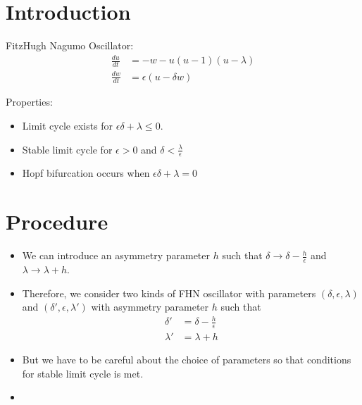 \documentclass[paper=a4, fontsize=12pt]{scrartcl} %
\begin{document}
\section{Introduction}
FitzHugh Nagumo Oscillator:
\begin{align}
\frac{du}{dt} &= - w - u(u-1)(u-\lambda) \nonumber \\
\frac{dw}{dt} &= \epsilon(u-\delta w)
\end{align}

Properties:
\begin{itemize}
    \item Limit cycle exists for $\epsilon\delta + \lambda\leq0$.
    \item Stable limit cycle for $\epsilon > 0$ and $\delta < 
    \frac{\lambda}{\epsilon}$
    \item Hopf bifurcation occurs when $\epsilon\delta + \lambda = 0$
\end{itemize}
\section{Procedure}
\begin{itemize}
    \item We can introduce an asymmetry parameter $h$ such that $\delta 
    \rightarrow \delta - \frac{h}{\epsilon}$ and $\lambda \rightarrow 
    \lambda + h$.
    \item Therefore, we consider two kinds of FHN oscillator with parameters 
    $(\delta,\epsilon, \lambda)$ and $(\delta', \epsilon, \lambda')$ with 
    asymmetry parameter $h$ such that   \begin{align*}
    \delta' &= \delta - \frac{h}{\epsilon} \\
    \lambda'  &=\lambda + h
    \end{align*}
    \item But we have to be careful about the choice of parameters so that 
    conditions for stable limit cycle is met.
    \item 
\end{itemize}
\end{document}
